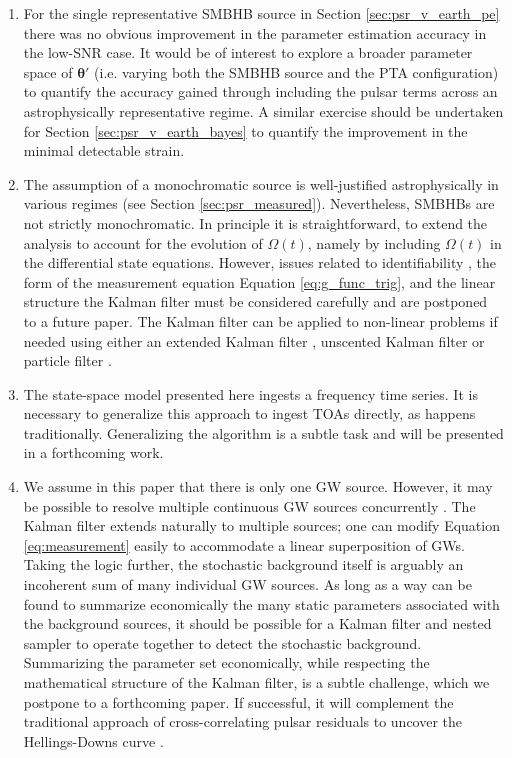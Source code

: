 \documentclass[fleqn,usenatbib,useAMS]{mnras}
\begin{document}
\begin{enumerate}[leftmargin=2em]
		
	\item For the single representative SMBHB source in Section \ref{sec:psr_v_earth_pe} there was no obvious improvement in the parameter estimation accuracy in the low-SNR case. It would be of interest to explore a broader parameter space of $\boldsymbol{\theta}'$ (i.e. varying both the SMBHB source and the PTA configuration) to quantify the accuracy gained through including the pulsar terms across an astrophysically representative regime. A similar exercise should be undertaken for Section \ref{sec:psr_v_earth_bayes} to quantify the improvement in the minimal detectable strain. \newline 
	
	\item The assumption of a monochromatic source is well-justified astrophysically in various regimes (see Section \ref{sec:psr_measured}).  Nevertheless, SMBHBs are not strictly monochromatic. In principle it is straightforward, to extend the analysis to account for the evolution of $\Omega(t)$, namely by including $\Omega(t)$ in the differential state equations. However, issues related to identifiability \citep{e5be7c83a0d24500826f6e1b414d1733}, the form of the measurement equation Equation \eqref{eq:g_func_trig}, and the linear structure the Kalman filter must be considered carefully and are postponed to a future paper. The Kalman filter can be applied to non-linear problems if needed using either an extended Kalman filter \citep{zarchan2000fundamentals}, unscented Kalman filter \citep{882463van} or particle filter \citep{Simon10}. \newline 
	
	
	\item The state-space model presented here ingests a frequency time series. It is necessary to generalize this approach to ingest TOAs directly, as happens traditionally. Generalizing the algorithm is a subtle task and will be presented in a forthcoming work. \newline
	
	
	\item We assume in this paper that there is only one GW source. However, it may be possible to resolve multiple continuous GW sources concurrently \citep{PhysRevD.85.044034}. The Kalman filter extends naturally to multiple sources; one can modify Equation \eqref{eq:measurement} easily to accommodate a linear superposition of GWs. Taking the logic further, the stochastic background itself is arguably an incoherent sum of many individual GW sources. As long as a way can be found to summarize economically the many static parameters associated with the background sources, it should be possible for a Kalman filter and nested sampler to operate together to detect the stochastic background. Summarizing the parameter set economically, while respecting the mathematical structure of the Kalman filter, is a subtle challenge, which we postpone to a forthcoming paper. If successful, it will complement the traditional approach of cross-correlating pulsar residuals to uncover the Hellings-Downs curve \citep{Hellings,2023ApJ...951L...8A}.
\end{enumerate}
\end{document}

